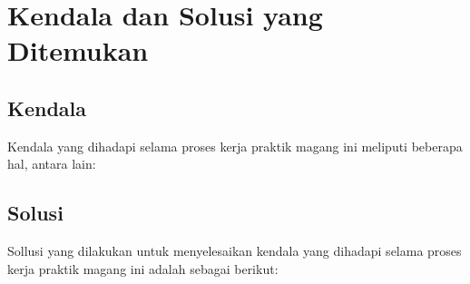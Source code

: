 \section{Kendala dan Solusi yang Ditemukan}
\subsection{Kendala}
Kendala yang dihadapi selama proses kerja praktik magang ini meliputi beberapa hal, antara lain:

\subsection{Solusi}
Sollusi yang dilakukan untuk menyelesaikan kendala yang dihadapi selama proses kerja praktik magang ini adalah sebagai berikut:







